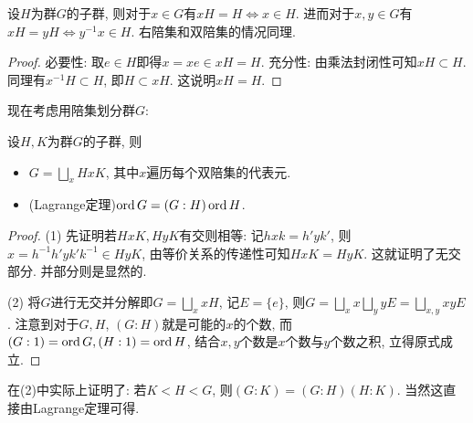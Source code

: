 \begin{proposition}{}
	设$H$为群$G$的子群, 则对于$x \in G$有$xH=H \Leftrightarrow x \in H$. 进而对于$x,y \in G$有$xH=yH \Leftrightarrow y^{-1}x \in H$. 右陪集和双陪集的情况同理. 
\end{proposition}
\begin{proof}
	必要性: 取$e \in H$即得$x=xe \in xH=H$. 充分性: 由乘法封闭性可知$xH \subset H$. 同理有$x^{-1}H \subset H$, 即$H \subset xH$. 这说明$xH=H$. 
\end{proof}

现在考虑用陪集划分群$G$: 

\begin{proposition}{}
	设$H,K$为群$G$的子群, 则
	\begin{itemize}
		\item $G=\bigsqcup_x HxK$, 其中$x$遍历每个双陪集的代表元. 
		\item (Lagrange定理)$\operatorname{ord} G = (G:H) \operatorname{ord} H$. 
	\end{itemize}
\end{proposition}
\begin{proof}
	(1) 先证明若$HxK,HyK$有交则相等: 记$hxk=h'yk'$, 则$x=h^{-1}h'yk'k^{-1} \in HyK$, 由等价关系的传递性可知$HxK=HyK$. 这就证明了无交部分. 并部分则是显然的. 
	
	(2) 将$G$进行无交并分解即$G=\bigsqcup_x xH$, 记$E=\{ e \}$, 则$G=\bigsqcup_x x \bigsqcup_{y} yE = \bigsqcup_{x,y} xy E$. 注意到对于$G,H$, $(G:H)$就是可能的$x$的个数, 而$(G:1)=\operatorname{ord} G,(H:1)=\operatorname{ord} H$, 结合$x,y$个数是$x$个数与$y$个数之积, 立得原式成立. 
\end{proof}
\begin{remark}
	在(2)中实际上证明了: 若$K<H<G$, 则$(G:K)=(G:H)(H:K)$. 当然这直接由Lagrange定理可得. 
\end{remark}
























